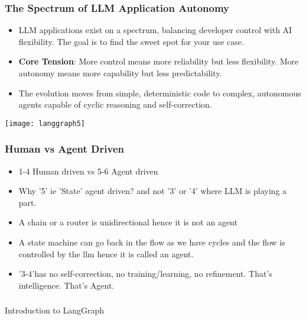 \begin{frame}[fragile]\frametitle{The Spectrum of LLM Application Autonomy}
      \begin{itemize}
        \item LLM applications exist on a spectrum, balancing developer control with AI flexibility. The goal is to find the sweet spot for your use case.
        \item \textbf{Core Tension}: More control means more reliability but less flexibility. More autonomy means more capability but less predictability.
        \item The evolution moves from simple, deterministic code to complex, autonomous agents capable of cyclic reasoning and self-correction.
      \end{itemize}
\begin{center}
    \texttt{[image: langgraph5]}
\end{center}	  
\end{frame}

\begin{frame}[fragile]\frametitle{Human vs Agent Driven}
      \begin{itemize}
        \item 1-4 Human driven vs 5-6 Agent driven
		\item Why '5' ie 'State' agent driven? and not '3' or '4' where LLM is playing a part.
		\item A chain or a router is unidirectional hence it is not an agent
		\item A state machine can  go back in the flow as we have cycles and the flow is
controlled by the llm hence it is called an agent. 
		\item '3-4'has no self-correction, no training/learning, no refinement. That's intelligence. That's Agent.
      \end{itemize}
\end{frame}

\begin{frame}[fragile]\frametitle{}
\begin{center}
{\Large Introduction to LangGraph}
\end{center}
\end{frame}


